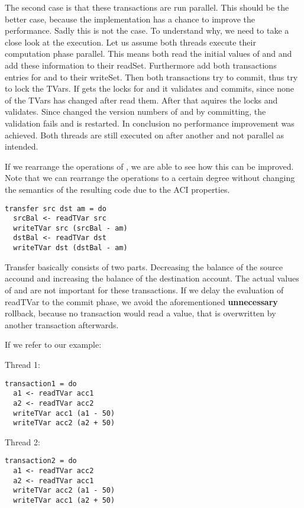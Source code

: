 The second case is that these transactions are run parallel. This should be the better case, because the implementation
has a chance to improve the performance. Sadly this is not the case. To understand why, we need to take a close look at 
the execution. Let us assume both threads execute their computation phase parallel. This means both read the initial 
values of  and  and add these information to their readSet. Furthermore add both transactions 
entries for  and  to their writeSet. Then both transactions try to commit, thus try to lock 
the TVars. If  gets the locks for  and  it validates and commits, since none of 
the TVars has changed after  read them. After that  aquires the locks and validates.
Since  changed the version numbers of  and  by committing, the validation fails
and  is restarted. 
In conclusion no performance improvement was achieved. Both threads are still executed 
on after another and not parallel as intended.

If we rearrange the operations of , we are able to see how this can be improved. Note that we can rearrange the 
operations to a certain degree without changing the semantics of the resulting code due to the ACI properties. 
\begin{lstlisting}
transfer src dst am = do 
  srcBal <- readTVar src
  writeTVar src (srcBal - am)
  dstBal <- readTVar dst
  writeTVar dst (dstBal - am)
\end{lstlisting}
Transfer basically consists of two parts. Decreasing the balance of the source accound and increasing the 
balance of the destination account. The actual values of  and  are not important for
these transactions. If we delay the evaluation of readTVar to the commit phase, we avoid the 
aforementioned \textbf{unnecessary} rollback, because no transaction would read a value, that is overwritten
by another transaction afterwards. 

If we refer to our example: 
\par\noindent
\begin{minipage}[t]{.45\textwidth}
Thread 1:
\begin{lstlisting}[frame=lrtb]
transaction1 = do
  a1 <- readTVar acc1
  a2 <- readTVar acc2
  writeTVar acc1 (a1 - 50)
  writeTVar acc2 (a2 + 50)
\end{lstlisting}
\end{minipage}
\hfill
\begin{minipage}[t]{.45\textwidth}
Thread 2:
\begin{lstlisting}[frame=lrtb]
transaction2 = do 
  a1 <- readTVar acc2
  a2 <- readTVar acc1
  writeTVar acc2 (a1 - 50)
  writeTVar acc1 (a2 + 50)
\end{lstlisting}
\end{minipage}

